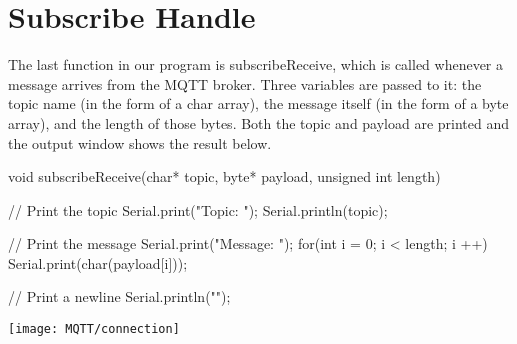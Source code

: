 \section{Subscribe Handle}

The last function in our program is subscribeReceive, which is called whenever a message arrives from the MQTT broker. Three variables are passed to it: the topic name (in the form of a char array), the message itself (in the form of a byte array), and the length of those bytes. Both the topic and payload are printed and the output window shows the result below.

\bigskip

\begin{Arduino}
void subscribeReceive(char* topic, byte* payload, unsigned int length)
{
	// Print the topic
	Serial.print("Topic: ");
	Serial.println(topic);
		
	// Print the message
	Serial.print("Message: ");
	for(int i = 0; i < length; i ++)
	{
		Serial.print(char(payload[i]));
	}
		
	// Print a newline
	Serial.println("");
}
\end{Arduino}

\bigskip

\begin{center}
  \texttt{[image: MQTT/connection]}
\end{center}
